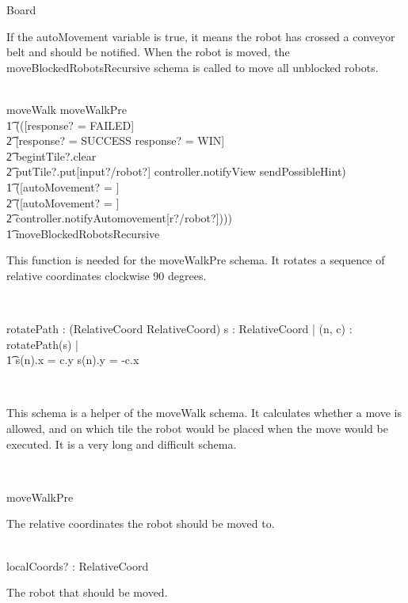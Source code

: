 \documentclass[12pt]{article}
\begin{document}
\begin{class}{Board}
\begin{zpar}
If the autoMovement variable is true, it means the robot has crossed a conveyor belt and should be notified. When the robot is moved, the moveBlockedRobotsRecursive schema is called to move all unblocked robots.
\end{zpar} \\
moveWalk \sdef moveWalkPre \; \; \comp \\ \t1 (([response? = FAILED] \; \; [] \\ \t2 [response? = SUCCESS \vee response? = WIN] \;\; \wedge \\ \t2 begintTile?.clear \; \; \wedge \\ \t2 putTile?.put[input?/robot?] \wedge controller.notifyView \wedge sendPossibleHint) \; \; \wedge \\ \t1 ([autoMovement? = \false] \; \; [] \\ \t2 ([autoMovement? = \true] \; \; \wedge \\ \t2 controller.notifyAutomovement[r?/robot?]))) \; \; \comp \\ \t1
moveBlockedRobotsRecursive \\
\begin{zpar}
This function is needed for the moveWalkPre schema. It rotates a sequence of relative coordinates clockwise 90 degrees.
\end{zpar} \\
\begin{axdef}
rotatePath : \power (\seq RelativeCoord \fun \seq RelativeCoord)
\where
\forall s : \seq RelativeCoord | \forall (n, c) : rotatePath(s) | \\ \t1
s(n).x = c.y \wedge s(n).y = -c.x
\end{axdef} \\
\begin{zpar}
This schema is a helper of the moveWalk schema. It calculates whether a move is allowed, and on which tile the robot would be placed when the move would be executed. It is a very long and difficult schema.
\end{zpar} \\
\begin{nobottomschema}{moveWalkPre}
\begin{zpar}
The relative coordinates the robot should be moved to.
\end{zpar} \\
localCoords? : RelativeCoord \\
\begin{zpar}
The robot that should be moved.
\end{zpar} \\

\end{nobottomschema}
\end{class}
\end{document}
